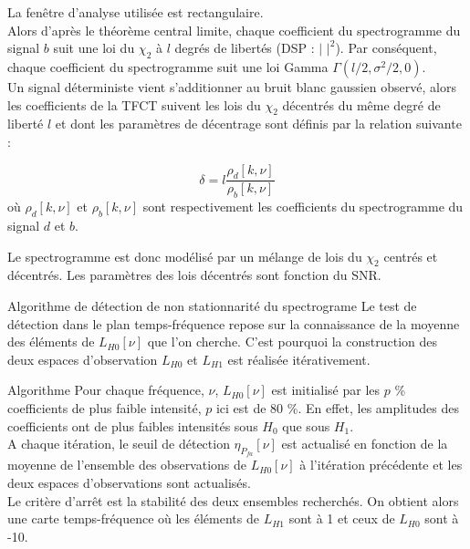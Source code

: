 \documentclass{beamer}
\begin{document}
\begin{frame}
La fenêtre d'analyse utilisée est rectangulaire.\\
Alors d'après le théorème central limite, chaque coefficient du spectrogramme du signal $b$ suit une loi du $\chi_2$ à $l$ degrés de libertés (DSP : $|$ $|^2$). Par conséquent, chaque coefficient du spectrogramme suit une loi Gamma $\Gamma(l/2,\sigma^2/2,0).$ \\
\vspace{0.25cm}
Un signal déterministe vient s'additionner au bruit blanc gaussien observé, alors les coefficients de la TFCT suivent les lois du $\chi_2$ décentrés du même degré de liberté $l$ et dont les paramètres de décentrage sont définis par la relation suivante :

\begin{equation}
\delta = l \frac{\rho_d[k,\nu]}{\rho_b[k,\nu]}
\label{eq2}
\end{equation}
où $\rho_d[k,\nu]$ et $\rho_b[k,\nu]$ sont respectivement les coefficients du spectrogramme du signal $d$ et $b$.

Le spectrogramme est donc modélisé par un mélange de lois du $\chi_2$ centrés et décentrés. Les paramètres des lois décentrés sont fonction du SNR.
\end{frame}

\begin{frame}{Algorithme de détection de non stationnarité du spectrograme}
Le test de détection dans le plan temps-fréquence repose sur la connaissance de la moyenne des éléments de $L_{H0}[\nu]$ que l'on cherche. C'est pourquoi la construction des deux espaces d'observation $L_{H0}$ et $L_{H1}$ est réalisée itérativement. 
\end{frame}

\begin{frame}
\begin{block}{Algorithme}
Pour chaque fréquence, $\nu$, $L_{H0}[\nu]$ est initialisé par les $p$ \% coefficients de plus faible intensité, $p$ ici est de 80 \%. En effet, les amplitudes des coefficients ont de plus faibles intensités sous $H_0$ que sous $H_1$. \\
A chaque itération, le seuil de détection $\eta_{P_{fa}}[\nu]$ est actualisé en fonction de la moyenne de l'ensemble des observations de $L_{H0}[\nu]$ à l'itération précédente et les deux espaces d'observations sont actualisés. \\
Le critère d'arrêt est la stabilité des deux ensembles recherchés. On obtient alors une carte temps-fréquence où les éléments de $L_{H1}$ sont à 1 et ceux de $L_{H0}$ sont à -10.
\end{block}
\end{frame}
\end{document}
